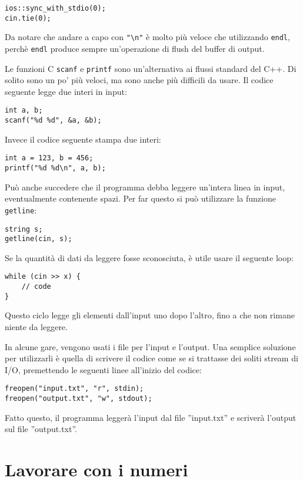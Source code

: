 \begin{lstlisting}
ios::sync_with_stdio(0);
cin.tie(0);
\end{lstlisting}

Da notare che andare a capo con \texttt{"\textbackslash n"}
è molto più veloce che utilizzando \texttt{endl},
perchè \texttt{endl} produce sempre 
un'operazione di flush del buffer di output.

Le funzioni C \texttt{scanf}
e \texttt{printf} sono un'alternativa ai flussi standard
del C++.
Di solito sono un po' più veloci,
ma sono anche più difficili da usare.
Il codice seguente legge due interi in input:

\begin{lstlisting}
int a, b;
scanf("%d %d", &a, &b);
\end{lstlisting}

Invece il codice seguente stampa due interi:

\begin{lstlisting}
int a = 123, b = 456;
printf("%d %d\n", a, b);
\end{lstlisting}

Può anche succedere che il programma debba leggere un'intera linea
in input, eventualmente contenente spazi.
Per far questo si può utilizzare la funzione \texttt{getline}:

\begin{lstlisting}
string s;
getline(cin, s);
\end{lstlisting}

Se la quantità di dati da leggere fosse sconosciuta,
è utile usare il seguente loop:

\begin{lstlisting}
while (cin >> x) {
    // code
}
\end{lstlisting}
Questo ciclo legge gli elementi dall'input 
uno dopo l'altro, fino a che non rimane niente
da leggere.

In alcune gare, vengono usati i file per
l'input e l'output.
Una semplice soluzione per utilizzarli è
quella di scrivere il codice come se 
si trattasse dei soliti stream di I/O,
premettendo le seguenti linee all'inizio del codice:
\begin{lstlisting}
freopen("input.txt", "r", stdin);
freopen("output.txt", "w", stdout);
\end{lstlisting}
Fatto questo, il programma leggerà l'input dal file ''input.txt''
e scriverà l'output sul file ''output.txt''.

\section{Lavorare con i numeri}

